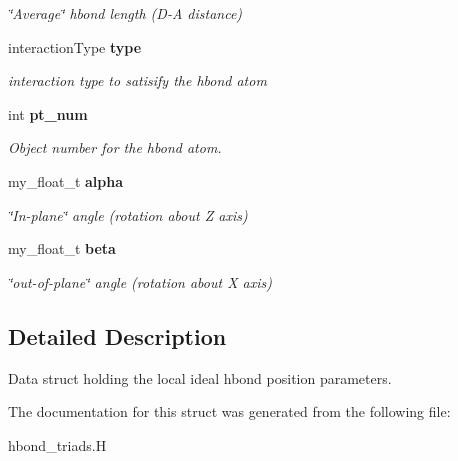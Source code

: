 \begin{CompactItemize}
\begin{CompactList}\small\item\em \char`\"{}Average\char`\"{} hbond length (D-A distance) \item\end{CompactList}\item 
interaction\-Type \bf{type}\label{structASCbase_1_1hbond__triad__t_9211af10c6925f80ac7e6a1cb01f92a6}

\begin{CompactList}\small\item\em interaction type to satisify the hbond atom \item\end{CompactList}\item 
int \bf{pt\_\-num}\label{structASCbase_1_1hbond__triad__t_19531534552566a3002c718ccfeef088}

\begin{CompactList}\small\item\em Object number for the hbond atom. \item\end{CompactList}\item 
my\_\-float\_\-t \bf{alpha}\label{structASCbase_1_1hbond__triad__t_b80b511a9b9ed06e7f4ad429e4741aa2}

\begin{CompactList}\small\item\em \char`\"{}In-plane\char`\"{} angle (rotation about Z axis) \item\end{CompactList}\item 
my\_\-float\_\-t \bf{beta}\label{structASCbase_1_1hbond__triad__t_1eb0d83d4bce81817260cc3cb7d843d5}

\begin{CompactList}\small\item\em \char`\"{}out-of-plane\char`\"{} angle (rotation about X axis) \item\end{CompactList}\end{CompactItemize}


\subsection{Detailed Description}
Data struct holding the local ideal hbond position parameters. 



The documentation for this struct was generated from the following file:\begin{CompactItemize}
\item 
hbond\_\-triads.H\end{CompactItemize}
